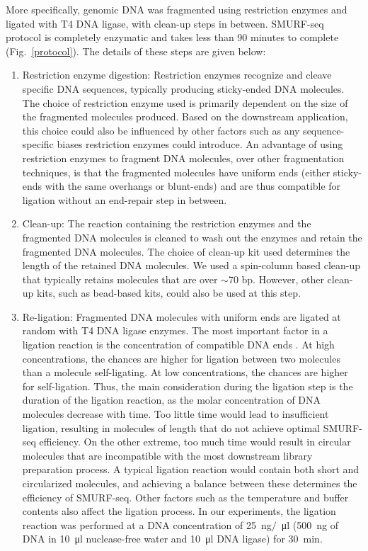 More specifically, genomic DNA was fragmented using restriction enzymes
and ligated with T4 DNA ligase, with clean-up steps in between.
SMURF-seq protocol is completely enzymatic and takes less than 90
minutes to complete (Fig.~\ref{protocol}).  The details of these steps
are given below:
\begin{enumerate}
\item Restriction enzyme digestion: Restriction enzymes recognize
  and cleave specific DNA sequences, typically producing sticky-ended DNA
  molecules.
  The choice of restriction enzyme used is primarily dependent on the
  size of the fragmented molecules produced. Based on the downstream
  application, this choice could also be influenced by other factors such as
  any sequence-specific biases restriction enzymes could introduce.
  An advantage of using restriction enzymes to fragment DNA molecules,
  over other fragmentation techniques, is that the fragmented molecules
  have uniform ends (either sticky-ends with the same overhangs or
  blunt-ends) and are thus compatible for ligation without an end-repair
  step in between.

\item Clean-up: The reaction containing the restriction enzymes and the
  fragmented DNA molecules is cleaned to wash out the enzymes and retain
  the fragmented DNA molecules. The choice of clean-up kit used determines
  the length of the retained DNA molecules. We used a spin-column
  based clean-up that typically retains molecules that are over $\sim$70
  bp. However, other clean-up kits, such as bead-based kits, could also be
  used at this step.

\item Re-ligation: Fragmented DNA molecules with uniform ends are
  ligated at random with T4 DNA ligase enzymes.
  The most important factor in a ligation reaction is the
  concentration of compatible DNA ends \citep{dugaiczyk1975ligation}. At
  high concentrations, the chances are higher for ligation between two
  molecules than a molecule self-ligating. At low concentrations, the
  chances are higher for self-ligation.
  Thus, the main consideration during the ligation step is the
  duration of the ligation reaction, as the molar concentration of DNA
  molecules decrease with time. Too little time would lead to insufficient
  ligation, resulting in molecules of length that do not achieve optimal
  SMURF-seq efficiency. On the other extreme, too much time would result
  in circular molecules that are incompatible with the most downstream
  library preparation process. A typical ligation reaction would contain
  both short and circularized molecules, and achieving a balance between
  these determines the efficiency of SMURF-seq.
  Other factors such as the temperature and buffer contents also affect
  the ligation process.
  In our experiments, the ligation reaction was performed at a DNA
  concentration of \SI{25}{\nano\gram}$/$\SI{}{\micro\litre}
  (\SI{500}{\nano\gram} of DNA in \SI{10}{\micro\litre} nuclease-free
  water and \SI{10}{\micro\litre} DNA ligase) for \SI{30}{\minute}.


\end{enumerate}
